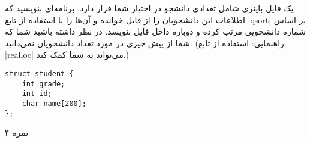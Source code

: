 \documentclass[../main.tex]{subfiles}
\begin{document}
یک فایل باینری شامل تعدادی دانشجو در اختیار شما قرار دارد. برنامه‌ای بنویسید که اطلاعات این دانشجویان را از فایل خوانده و آن‌ها را با استفاده از تابع |qsort| بر اساس شماره دانشجویی مرتب کرده و دوباره داخل فایل بنویسد.
در نظر داشته باشید شما که شما از پیش چیزی در مورد تعداد دانشجویان نمی‌دانید. (راهنمایی: استفاده از تابع |realloc| می‌تواند به شما کمک کند.)

\begin{latin}
\begin{verbatim}
struct student {
    int grade;
    int id;
    char name[200];
};
\end{verbatim}
\end{latin}

۴ نمره
\end{document}
